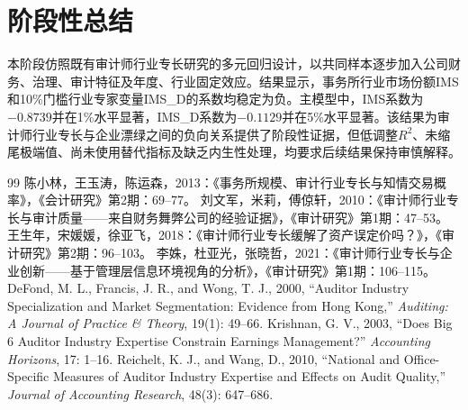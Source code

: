 \documentclass[UTF8,12pt,a4paper]{ctexart}
\begin{document}
\section{阶段性总结}

本阶段仿照既有审计师行业专长研究的多元回归设计，以共同样本逐步加入公司财务、治理、审计特征及年度、行业固定效应。结果显示，事务所行业市场份额IMS和10\%门槛行业专家变量IMS\_D的系数均稳定为负。主模型中，IMS系数为$-0.8739$并在1\%水平显著，IMS\_D系数为$-0.1129$并在5\%水平显著。该结果为审计师行业专长与企业漂绿之间的负向关系提供了阶段性证据，但低调整$R^2$、未缩尾极端值、尚未使用替代指标及缺乏内生性处理，均要求后续结果保持审慎解释。

\begin{thebibliography}{99}
 陈小林，王玉涛，陈运森，2013：《事务所规模、审计行业专长与知情交易概率》，《会计研究》第2期：69--77。
 刘文军，米莉，傅倞轩，2010：《审计师行业专长与审计质量——来自财务舞弊公司的经验证据》，《审计研究》第1期：47--53。
 王生年，宋媛媛，徐亚飞，2018：《审计师行业专长缓解了资产误定价吗？》，《审计研究》第2期：96--103。
 李姝，杜亚光，张晓哲，2021：《审计师行业专长与企业创新——基于管理层信息环境视角的分析》，《审计研究》第1期：106--115。
 DeFond, M. L., Francis, J. R., and Wong, T. J., 2000, ``Auditor Industry Specialization and Market Segmentation: Evidence from Hong Kong,'' \textit{Auditing: A Journal of Practice \& Theory}, 19(1): 49--66.
 Krishnan, G. V., 2003, ``Does Big 6 Auditor Industry Expertise Constrain Earnings Management?'' \textit{Accounting Horizons}, 17: 1--16.
 Reichelt, K. J., and Wang, D., 2010, ``National and Office-Specific Measures of Auditor Industry Expertise and Effects on Audit Quality,'' \textit{Journal of Accounting Research}, 48(3): 647--686.
\end{thebibliography}
\end{document}

